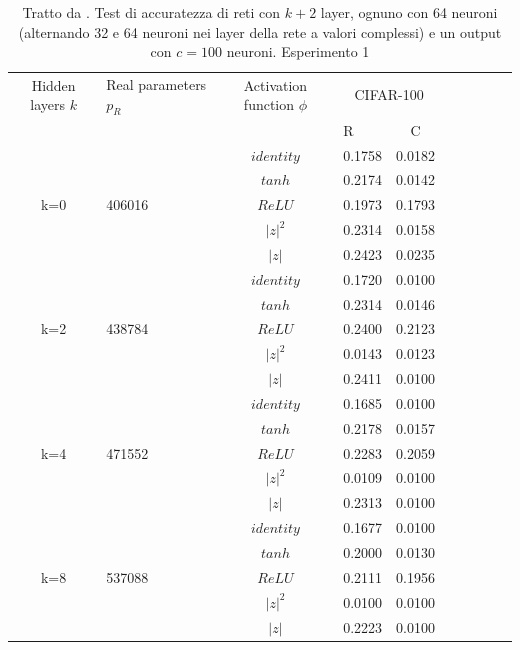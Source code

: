 \documentclass[a4paper,12pt]{report}
\begin{document}
 \newpage
  
 \begin{table}[h]
  \centering
  \begin{tabular}{cp{} cp{}   cp{} cp{} cp{}}
   \cline{1-5}
   Hidden layers $k$ & Real parameters $p_R$ & Activation function $\phi$ & \multicolumn{2}{c}{CIFAR-100}\\
   \cline{4-5}
   & & & R & C \\
   \cline{1-5}
   & & $identity$ & 0.1758 & 0.0182 \\
   \cline{3-5}
   & & $tanh$ & 0.2174 & 0.0142 \\
   \cline{3-5}
   k=0 & 406016 & $ReLU$ & 0.1973 & 0.1793 \\
   \cline{3-5}
   & & $|z|^2$ & 0.2314 & 0.0158 \\
   \cline{3-5}
   & & $|z|$ & 0.2423 & 0.0235 \\
   \cline{1-5}
  
   & & $identity$ & 0.1720 & 0.0100 \\
   \cline{3-5}
   & & $tanh$ & 0.2314 & 0.0146 \\
   \cline{3-5}
   k=2 & 438784 & $ReLU$ & 0.2400 & 0.2123 \\
   \cline{3-5}
   & & $|z|^2$ & 0.0143 & 0.0123 \\
   \cline{3-5}
   & & $|z|$ & 0.2411 & 0.0100 \\
   \cline{1-5}
  
   & & $identity$ & 0.1685 & 0.0100 \\
   \cline{3-5}
   & & $tanh$ & 0.2178 & 0.0157 \\
   \cline{3-5}
   k=4 & 471552 & $ReLU$ & 0.2283 & 0.2059 \\
   \cline{3-5}
   & & $|z|^2$ & 0.0109 & 0.0100 \\
   \cline{3-5}
   & & $|z|$ & 0.2313 & 0.0100 \\
   \cline{1-5}
   
   & & $identity$ & 0.1677 & 0.0100 \\
   \cline{3-5}
   & & $tanh$ & 0.2000 & 0.0130 \\
   \cline{3-5}
   k=8 & 537088 & $ReLU$ & 0.2111 & 0.1956 \\
   \cline{3-5}
   & & $|z|^2$ & 0.0100 & 0.0100 \\
   \cline{3-5}
   & & $|z|$ & 0.2223 & 0.0100 \\
   \cline{1-5}
  \end{tabular}
  \caption{Tratto da \cite{monning2018evaluation}. Test di accuratezza di reti con $k+2$ layer, ognuno con 64 neuroni (alternando 32 e 64 neuroni nei layer della rete a valori complessi) e un output con $c=100$ neuroni. Esperimento 1}
  \label{CIFAR-1001Tab}
 \end{table}
  
\end{document}

